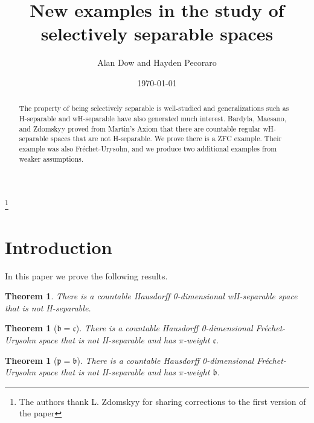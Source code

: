 \documentclass{amsart}
\newtheorem{theorem}[thm]{Theorem}
\theoremstyle{definition}
\theoremstyle{remark}
\begin{document}
\title{New examples in the study of selectively separable spaces}
\author{Alan Dow and Hayden Pecoraro}

\address{Department of Mathematics and Statistics,
University of North Carolina at Charlotte, 
Charlotte, NC 28223}




\thanks{The authors thank L. Zdomskyy for sharing corrections to the first version of the paper}

\date{\today}

 \begin{abstract} The property of being selectively separable is
 well-studied and generalizations such as H-separable and wH-separable
 have also generated much interest. Bardyla, Maesano, and Zdomskyy proved
 from Martin's Axiom that there are countable regular wH-separable spaces that
 are not H-separable. We prove there is a ZFC example. Their example was
 also Fr\'echet-Urysohn, and we produce two additional examples from 
 weaker assumptions.   
 \end{abstract}

\maketitle


\section{Introduction}

In this paper we prove the following results.

\begin{theorem}  There is a countable Hausdorff 0-dimensional wH-separable space
that is not H-separable.
\end{theorem}

\begin{theorem}[$\mathfrak b = \mathfrak c$] There is a countable Hausdorff 0-dimensional
 Fr\'echet-Urysohn space that is not H-separable and has $\pi$-weight $\mathfrak c$.
\end{theorem}

\begin{theorem}[$\mathfrak p = \mathfrak b$] There is a countable Hausdorff 0-dimensional 
 Fr\'echet-Urysohn space that is not H-separable and has $\pi$-weight $\mathfrak b$.
\end{theorem}
\end{document}
